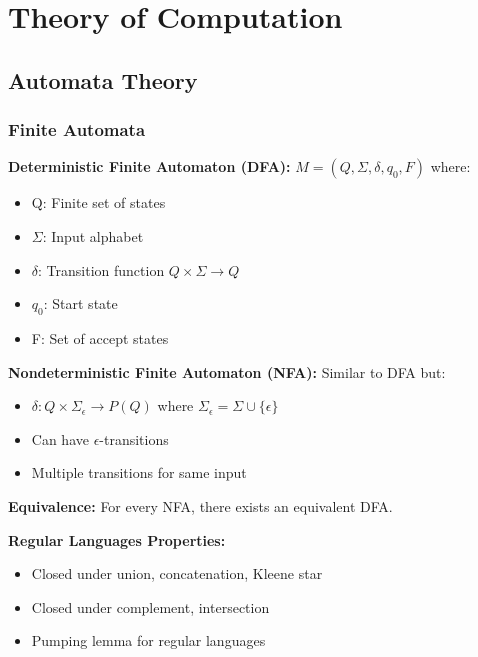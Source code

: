 \documentclass[11pt,a4paper]{article}
\begin{document}
\section{Theory of Computation}

\subsection{Automata Theory}

\subsubsection{Finite Automata}

\begin{defbox}
\textbf{Deterministic Finite Automaton (DFA):} $M = (Q, \Sigma, \delta, q_0, F)$ where:
\begin{itemize}
    \item Q: Finite set of states
    \item $\Sigma$: Input alphabet
    \item $\delta$: Transition function $Q \times \Sigma \rightarrow Q$
    \item $q_0$: Start state
    \item F: Set of accept states
\end{itemize}
\end{defbox}

\begin{defbox}
\textbf{Nondeterministic Finite Automaton (NFA):} Similar to DFA but:
\begin{itemize}
    \item $\delta: Q \times \Sigma_\epsilon \rightarrow P(Q)$ where $\Sigma_\epsilon = \Sigma \cup \{\epsilon\}$
    \item Can have $\epsilon$-transitions
    \item Multiple transitions for same input
\end{itemize}
\end{defbox}

\begin{thmbox}
\textbf{Equivalence:} For every NFA, there exists an equivalent DFA.
\end{thmbox}

\textbf{Regular Languages Properties:}
\begin{itemize}
    \item Closed under union, concatenation, Kleene star
    \item Closed under complement, intersection
    \item Pumping lemma for regular languages
\end{itemize}
\end{document}
